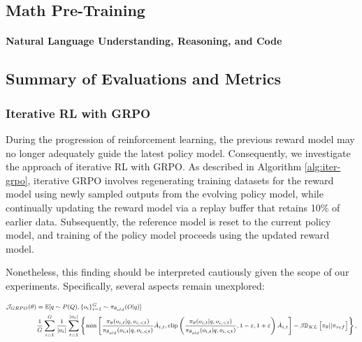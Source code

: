 \begin{itemize}[topsep=0pt]
\section{Math Pre-Training}

\paragraph{Natural Language Understanding, Reasoning, and Code}

\subsection{Summary of Evaluations and Metrics}

\subsubsection{Iterative RL with GRPO} During the progression of reinforcement learning, the previous reward model may no longer adequately guide the latest policy model. Consequently, we investigate the approach of iterative RL with GRPO. As described in Algorithm \ref{alg:iter-grpo}, iterative GRPO involves regenerating training datasets for the reward model using newly sampled outputs from the evolving policy model, while continually updating the reward model via a replay buffer that retains 10\% of earlier data. Subsequently, the reference model is reset to the current policy model, and training of the policy model proceeds using the updated reward model.

Nonetheless, this finding should be interpreted cautiously given the scope of our experiments. Specifically, several aspects remain unexplored:



\begin{equation}
\footnotesize
\begin{split}
    \mathcal{J}_{GRPO}(\theta) &= \mathbb{E}{[q \sim P(Q), \{o_i\}_{i=1}^G \sim \pi_{\theta_{old}}(O|q)]}  \\
    & \frac{1}{G}\sum_{i=1}^G\frac{1}{|o_i|} \sum_{t=1}^{|o_i|} \left\{ \min \left[ \frac{\pi_\theta(o_{i,t} | q, o_{i,<t})}{\pi_{\theta_{old}}(o_{i,t} | q, o_{i,<t})} \hat{A}_{i,t}, \text{clip} \left( \frac{\pi_\theta(o_{i,t} | q, o_{i,<t})}{\pi_{\theta_{old}}(o_{i,t} | q, o_{i,<t})}, 1 - \varepsilon, 1 + \varepsilon \right)  \hat{A}_{i,t} \right] - \beta \mathbb{D}_{KL}\left[\pi_{\theta} || \pi_{ref}\right]\right\} ,
\end{split}
\label{eq:GRPO-obj}
\end{equation}


\end{itemize}
